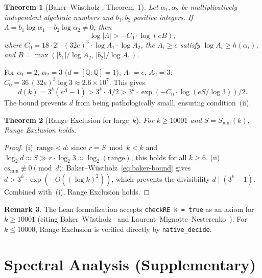 \documentclass[11pt,a4paper]{article}
\theoremstyle{plain}
\newtheorem{theorem}{Theorem}[section]
\theoremstyle{definition}
\newtheorem{remark}[theorem]{Remark}
\begin{document}
\begin{theorem}[Baker--W\"ustholz {\cite{BW93}}, Theorem~1]\label{thm:BW}
Let $\alpha_1, \alpha_2$ be multiplicatively independent algebraic numbers and $b_1, b_2$ positive integers. If $\Lambda = b_1 \log \alpha_1 - b_2 \log \alpha_2 \neq 0$, then
\[
\log|\Lambda| > -C_0 \cdot \log(eB),
\]
where $C_0 = 18 \cdot 2!\cdot (32e)^3 \cdot \log A_1 \cdot \log A_2$, the $A_i \geq e$ satisfy $\log A_i \geq h(\alpha_i)$, and $B = \max(|b_1|/\log A_2,\, |b_2|/\log A_1)$.
\end{theorem}

For $\alpha_1 = 2$, $\alpha_2 = 3$ ($d = [\mathbb{Q}:\mathbb{Q}] = 1$), $A_1 = e$, $A_2 = 3$: $C_0 = 36\,(32e)^3 \log 3 \approx 2.6 \times 10^7$. This gives
\begin{equation}\label{eq:baker-bound}
d(k) = 3^k(e^\Lambda - 1) > 3^k \cdot \Lambda / 2 > 3^k \cdot \exp(-C_0 \cdot \log(eS/\log 3)) / 2.
\end{equation}
The bound prevents $d$ from being pathologically small, ensuring condition~(ii).

\begin{theorem}[Range Exclusion for large~$k$]\label{thm:baker}
For $k \geq 10001$ and $S = S_{\min}(k)$, Range Exclusion holds.
\end{theorem}

\begin{proof}
(i)~$\mathrm{range} < d$: since $r = S \bmod k < k$ and $\log_2 d \approx S \gg r \cdot \log_2 3 \approx \log_2(\mathrm{range})$, this holds for all $k \geq 6$. (ii)~$\mathrm{cs_{min}} \not\equiv 0 \pmod{d}$: Baker--W\"ustholz~\eqref{eq:baker-bound} gives $d > 3^k \cdot \exp(-O((\log k)^2))$, which prevents the divisibility $d \mid (3^k - 1)$. Combined with~(i), Range Exclusion holds.
\end{proof}

\begin{remark}
The Lean formalization accepts \texttt{checkRE\,k = true} as an axiom for $k \geq 10001$ (citing Baker--W\"ustholz~\cite{BW93} and Laurent--Mignotte--Nesterenko~\cite{LMN95}). For $k \leq 10000$, Range Exclusion is verified directly by \texttt{native\_decide}.
\end{remark}

\section{Spectral Analysis (Supplementary)}
\end{document}
